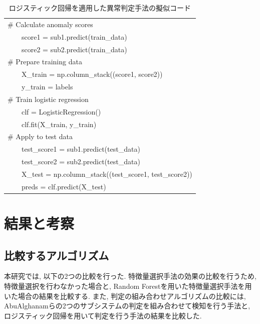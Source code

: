 \documentclass{css}
\begin{document}
\begin{table}[h!]
    \centering
    \caption{ロジスティック回帰を適用した異常判定手法の擬似コード}
    \begin{tabular}{|l|}
    \hline
    \# Calculate anomaly scores \\
       \ \ \ \ score1 = sub1.predict(train\_data) \\
       \ \ \ \ score2 = sub2.predict(train\_data) \\ 
    \# Prepare training data \\
       \ \ \ \ X\_train = np.column\_stack((score1, score2)) \\
       \ \ \ \ y\_train = labels \\ 
    \# Train logistic regression \\
       \ \ \ \ clf = LogisticRegression() \\
       \ \ \ \ clf.fit(X\_train, y\_train) \\ 
    \# Apply to test data \\
       \ \ \ \ test\_score1 = sub1.predict(test\_data) \\
       \ \ \ \ test\_score2 = sub2.predict(test\_data) \\
       \ \ \ \ X\_test = np.column\_stack((test\_score1, test\_score2)) \\
       \ \ \ \ preds = clf.predict(X\_test) \\ 
    \hline
    \end{tabular}
    \label{tab:logistic_regression}
\end{table}


\section{結果と考察}

\subsection{比較するアルゴリズム}

本研究では, 以下の2つの比較を行った. 
特徴量選択手法の効果の比較を行うため, 特徴量選択を行わなかった場合と, Random Forestを用いた特徴量選択手法を用いた場合の結果を比較する. また, 判定の組み合わせアルゴリズムの比較には, AbuAlghanamらの2つのサブシステムの判定を組み合わせて検知を行う手法\cite{AbuAlghanam2023-sx}と, ロジスティック回帰を用いて判定を行う手法の結果を比較した. 
\end{document}
